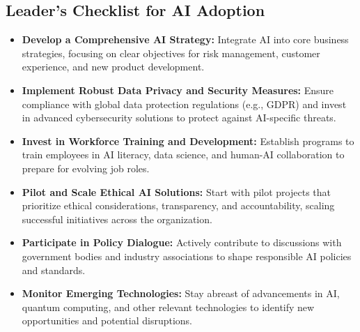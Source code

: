 \subsection{Leader's Checklist for AI Adoption}
\begin{itemize}
    \item \textbf{Develop a Comprehensive AI Strategy:} Integrate AI into core business strategies, focusing on clear objectives for risk management, customer experience, and new product development.
    \item \textbf{Implement Robust Data Privacy and Security Measures:} Ensure compliance with global data protection regulations (e.g., GDPR) and invest in advanced cybersecurity solutions to protect against AI-specific threats.
    \item \textbf{Invest in Workforce Training and Development:} Establish programs to train employees in AI literacy, data science, and human-AI collaboration to prepare for evolving job roles.
    \item \textbf{Pilot and Scale Ethical AI Solutions:} Start with pilot projects that prioritize ethical considerations, transparency, and accountability, scaling successful initiatives across the organization.
    \item \textbf{Participate in Policy Dialogue:} Actively contribute to discussions with government bodies and industry associations to shape responsible AI policies and standards.
    \item \textbf{Monitor Emerging Technologies:} Stay abreast of advancements in AI, quantum computing, and other relevant technologies to identify new opportunities and potential disruptions.
\end{itemize}

